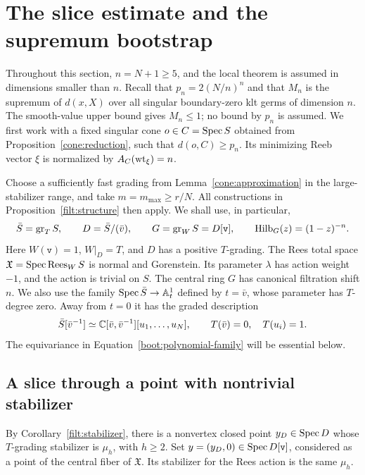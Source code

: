 \section{The slice estimate and the supremum bootstrap}
\label{boot:section}

Throughout this section, $n=N+1\geq 5$, and the local theorem is
assumed in dimensions smaller than $n$.  Recall that
$p_n=2(N/n)^n$ and that $M_n$ is the supremum of $d(x,X)$ over
all singular boundary-zero klt germs of dimension $n$.
The smooth-value upper bound gives $M_n\leq 1$; no bound by $p_n$
is assumed.  We first work with a fixed singular cone $o\in C=\operatorname{Spec} S$
obtained from Proposition~\ref{cone:reduction}, such that
$d(o,C)\geq p_n$.  Its minimizing Reeb vector $\xi$ is normalized by
$A_C(\operatorname{wt}_\xi)=n$.

Choose a sufficiently fast grading from
Lemma~\ref{cone:approximation} in the large-stabilizer range,
and take $m=m_{\max}\geq r/N$.  All constructions in
Proposition~\ref{filt:structure} then apply.  We shall use, in particular,
\begin{equation}
 \label{boot:algebra-data}
 \bar S=\operatorname{gr}_T S,
 \qquad D=\bar S/(\bar v),
 \qquad G=\operatorname{gr}_W S=D[\mathtt v],
 \qquad \operatorname{Hilb}_G(z)=(1-z)^{-n}.
\end{equation}
Here $W(\mathtt v)=1$, $W|_D=T$, and $D$ has a positive
$T$-grading.  The Rees total space
$\mathfrak X=\operatorname{Spec}\operatorname{Rees}_W S$ is normal and Gorenstein.  Its
parameter $\lambda$ has action weight $-1$, and the action is trivial
on $S$.  The central ring $G$ has canonical filtration shift $n$.
We also use the family $\operatorname{Spec}\bar S\to\mathbb A^1_t$ defined by $t=\bar v$,
whose parameter has $T$-degree zero.  Away from $t=0$ it has the graded description
\begin{equation}
 \label{boot:polynomial-family}
 \bar S[\bar v^{-1}]
 \simeq \mathbb C[\bar v,\bar v^{-1}][u_1,\ldots,u_N],
 \qquad T(\bar v)=0,\quad T(u_i)=1.
\end{equation}
The equivariance in Equation~\eqref{boot:polynomial-family} will be
essential below.

\subsection{A slice through a point with nontrivial stabilizer}

By Corollary~\ref{filt:stabilizer}, there is a nonvertex closed point
$y_D\in\operatorname{Spec} D$ whose $T$-grading stabilizer is $\mu_h$, with
$h\geq2$.  Set $y=(y_D,0)\in\operatorname{Spec} D[\mathtt v]$, considered as
a point of the central fiber of $\mathfrak X$.  Its stabilizer for
the Rees action is the same $\mu_h$.

